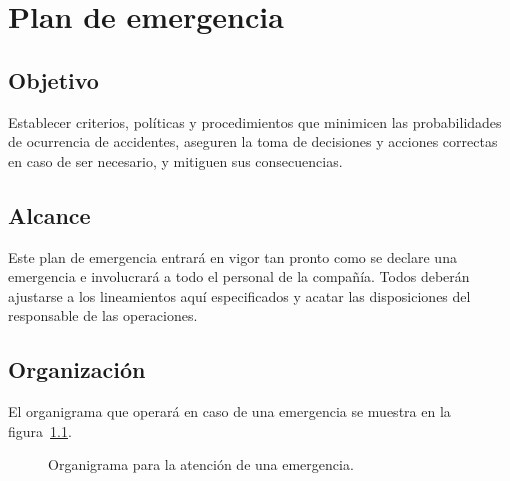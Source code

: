 \chapter{Plan de emergencia}

\section{Objetivo}

Establecer criterios, políticas y procedimientos que minimicen las probabilidades de ocurrencia de accidentes, aseguren la toma de decisiones y acciones correctas en caso de ser necesario, y mitiguen sus consecuencias.

\section{Alcance}

Este plan de emergencia entrará en vigor tan pronto como se declare una emergencia e involucrará a todo el personal de la compañía. Todos deberán ajustarse a los lineamientos aquí especificados y acatar las disposiciones del responsable de las operaciones.

\section{Organización}

El organigrama que operará en caso de una emergencia se muestra en la figura~\ref{fig:organigrama-emergencia}.

\begin{figure}[htbp]
  \centering
  \caption{Organigrama para la atención de una emergencia.}
  \label{fig:organigrama-emergencia}
\end{figure}

